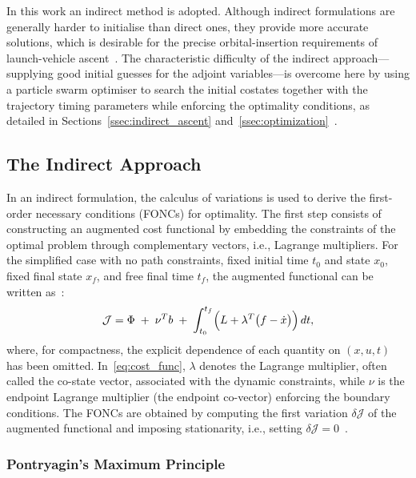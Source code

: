 In this work an indirect method is adopted. Although indirect formulations are generally harder to initialise than direct ones, they provide more accurate solutions, which is desirable for the precise orbital-insertion requirements of launch-vehicle ascent~\cite{conway2010spacecraft}. The characteristic difficulty of the indirect approach---supplying good initial guesses for the adjoint variables---is overcome here by using a particle swarm optimiser to search the initial costates together with the trajectory timing parameters while enforcing the optimality conditions, as detailed in Sections~\ref{ssec:indirect_ascent} and~\ref{ssec:optimization}~\cite{pontani2014particle}.


\subsection{The Indirect Approach}

In an indirect formulation, the calculus of variations is used to derive the first-order necessary conditions (FONCs) for optimality. The first step consists of constructing an augmented cost functional by embedding the constraints of the optimal problem through complementary vectors, i.e., Lagrange multipliers. For the simplified case with no path constraints, fixed initial time $t_0$ and state $x_0$, fixed final state $x_f$, and free final time $t_f$, the augmented functional can be written as~\cite{BettsSurvey1998}:
\begin{equation}
\label{eq:cost_func}
\mathcal{J}
=
\Phi \;+\; \nu^{T} b \;+\; \int_{t_0}^{t_f} \Bigl( L + \lambda^{T}\bigl(f-\dot{x}\bigr) \Bigr)\,dt ,
\end{equation}
where, for compactness, the explicit dependence of each quantity on $(x,u,t)$ has been omitted. In~\ref{eq:cost_func}, $\lambda$ denotes the Lagrange multiplier, often called the co-state vector, associated with the dynamic constraints, while $\nu$ is the endpoint Lagrange multiplier (the endpoint co-vector) enforcing the boundary conditions. The FONCs are obtained by computing the first variation $\delta \mathcal{J}$ of the augmented functional and imposing stationarity, i.e., setting $\delta \mathcal{J}=0$~\cite{Liberzon2012CalculusVariationsOptimalControl}.


\subsubsection{Pontryagin's Maximum Principle}

